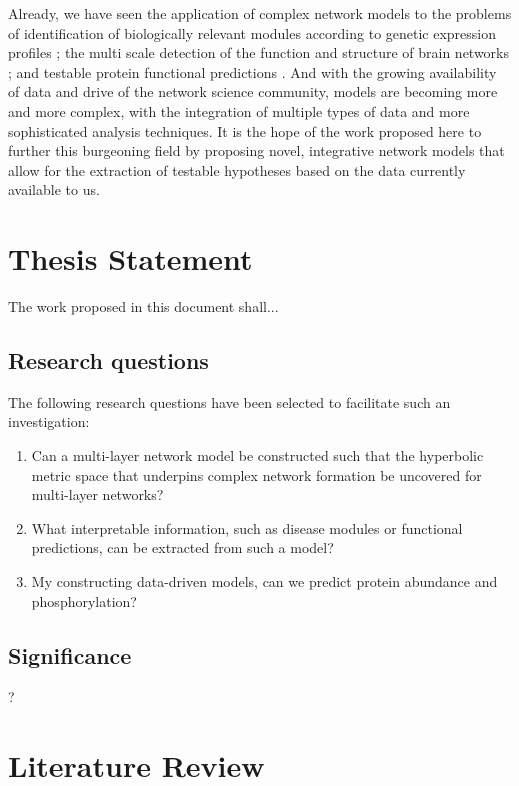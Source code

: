 \documentclass{report}
\begin{document}
	Already, we have seen the application of complex network models to the problems of identification of biologically relevant modules according to genetic expression profiles \cite{ideker2002discovering}; the multi scale detection of the function and structure of brain networks \cite{ashourvan2017multi}; and testable protein functional predictions \cite{palla2005uncovering,zhang2016integrated}. And with the growing availability of data and drive of the network science community, models are becoming more and more complex, with the integration of multiple types of data and more sophisticated analysis techniques. It is the hope of the work proposed here to further this burgeoning field by proposing novel, integrative network models that allow for the extraction of testable hypotheses based on the data currently available to us.
	
	
	\chapter{Thesis Statement}
	
	The work proposed in this document shall...
	
	\section{Research questions}
	
	The following research questions have been selected to facilitate such an investigation:
	
	\begin{enumerate}
		\item Can a multi-layer network model be constructed such that the hyperbolic metric space that underpins complex network formation be uncovered for multi-layer networks?
		\item What interpretable information, such as disease modules or functional predictions, can be extracted from such a model?
		\item My constructing data-driven models, can we predict protein abundance and phosphorylation?
	\end{enumerate}
	
	
	\section{Significance}
	?
	
	
	
	
	\chapter{Literature Review}
	
\end{document}
